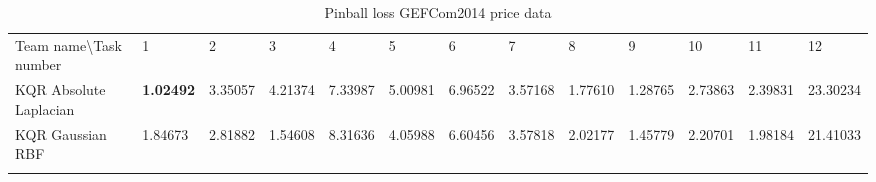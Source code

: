 \begin{table}[!ht]
    \centering
    \caption{Pinball loss GEFCom2014 price data}
    \label{tab:pinball loss gefcom2014 price data}
    \begin{adjustbox}{width=\textwidth}
    \begin{tabular}{lllllllllllll}
      \toprule
      \midrule
      Team name\textbackslash Task number                       & 1                               & 2                                  & 3                               & 4                              & 5                              & 6       & 7                               & 8       & 9       & 10                             & 11                             & 12               \\
  KQR Absolute Laplacian
  &
  \textbf{1.02492}
  &
  3.35057
  &
  4.21374
  &
  7.33987
  &
  5.00981
  &
  6.96522
  &
  3.57168
  &
  1.77610
  &
  1.28765
  &
  2.73863
  &
  2.39831
  &
  23.30234
  \\
  KQR Gaussian RBF
  &
  1.84673
  &
  2.81882
  &
  1.54608
  &
  8.31636
  &
  4.05988
  &
  6.60456
  &
  3.57818
  &
  2.02177
  &
  1.45779
  &
  2.20701
  &
  1.98184
  &
  21.41033
  \\
  \\
  

\end{tabular}
\end{adjustbox}
\end{table}

